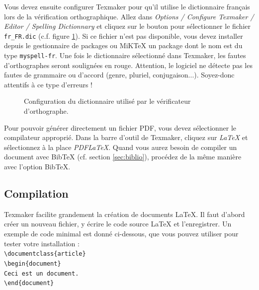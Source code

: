 \documentclass{ceri}
\begin{document}
Vous devez ensuite configurer Texmaker pour qu'il utilise le dictionnaire français lors de la vérification orthographique. Allez dans \textit{Options / Configure Texmaker / Editor / Spelling Dictionnary} et cliquez sur le bouton pour sélectionner le fichier \texttt{fr\_FR.dic} (c\@.f\@. figure \ref{fig:dictionnaire}). Si ce fichier n'est pas disponible, vous devez installer depuis le gestionnaire de packages ou MiKTeX un package dont le nom est du type \texttt{myspell-fr}. Une fois le dictionnaire sélectionné dans Texmaker, les fautes d'orthographes seront soulignées en rouge. Attention, le logiciel ne détecte pas les fautes de grammaire ou d'accord (genre, pluriel, conjugaison...). Soyez-donc attentifs à ce type d'erreurs !

\begin{figure}[htb]
	\centering
	\caption{Configuration du dictionnaire utilisé par le vérificateur d'orthographe.}
	\label{fig:dictionnaire}
\end{figure}

Pour pouvoir générer directement un fichier PDF, vous devez sélectionner le compilateur approprié. Dans la barre d'outil de Texmaker, cliquez sur \textit{LaTeX} et sélectionnez à la place \textit{PDFLaTeX}. Quand vous aurez besoin de compiler un document avec BibTeX (cf. section \ref{sec:biblio}), procédez de la même manière avec l'option BibTeX.

\subsection{Compilation}
Texmaker facilite grandement la création de documents \LaTeX{}. Il faut d'abord créer un nouveau fichier, y écrire le code source \LaTeX{} et l'enregistrer. Un exemple de code minimal est donné ci-dessous, que vous pouvez utiliser pour tester votre installation :
\vspace{0.3cm}\\
\noindent{}\texttt{\textbackslash{}documentclass\{article\}}\\
\noindent{}\texttt{\textbackslash{}begin\{document\}}\\
\indent{}\texttt{Ceci est un document.}\\
\noindent{}\texttt{\textbackslash{}end\{document\}}
\vspace{0.3cm}
\end{document}
